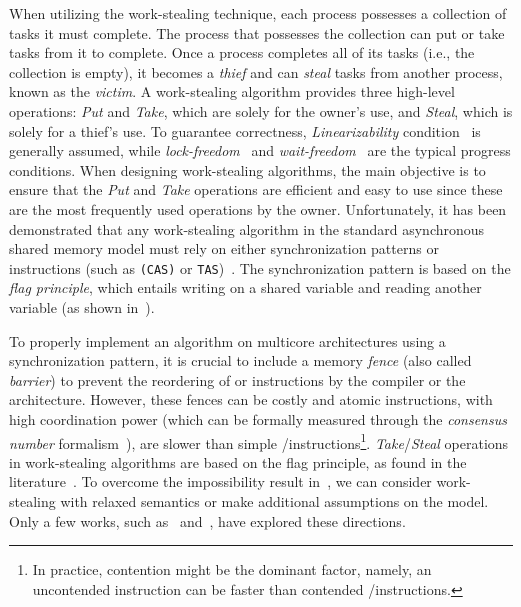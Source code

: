 When utilizing the work-stealing technique, each process possesses a collection of tasks it must complete. The process that possesses the collection can put or take tasks from it to complete. Once a process completes all of its tasks (i.e., the collection is empty), it becomes a \emph{thief} and can \emph{steal} tasks from another process, known as the \emph{victim}. A work-stealing algorithm provides three high-level operations: \emph{Put} and \emph{Take}, which are solely for the owner's use, and \emph{Steal}, which is solely for a thief's use. To guarantee correctness, \emph{Linearizability} condition~\cite{DBLP_journals_toplas_HerlihyW90}  is generally assumed, while \emph{lock-freedom}~\cite{DBLP_journals_toplas_HerlihyW90}  and \emph{wait-freedom}~\cite{DBLP_journals_toplas_Herlihy91} are the typical progress conditions. When designing work-stealing algorithms, the main objective is to ensure that the \emph{Put} and \emph{Take} operations are efficient and easy to use since these are the most frequently used operations by the owner. Unfortunately, it has been demonstrated that any work-stealing algorithm in the standard asynchronous shared memory model must rely on either \RAW synchronization patterns or \emph{\RMW} instructions (such as \CAS \texttt{(CAS)} or \TAS \texttt{TAS})~\cite{DBLP_conf_popl_AttiyaGHKMV11}. The \RAW synchronization pattern is based on the \emph{flag principle}, which entails writing on a shared variable and reading another variable (as shown in~\cite{DBLP_books_daglib_0020056}).

To properly implement an algorithm on multicore architectures using a synchronization pattern, it is crucial to include a memory \emph{fence} (also called \emph{barrier}) to prevent the reordering of \R or \W instructions by the compiler or the architecture. However, these fences can be costly and atomic \RMW instructions, with high coordination power (which can be formally measured through the \emph{consensus number} formalism~\cite{DBLP_journals_toplas_Herlihy91}), are slower than simple \R/\W instructions\footnote{In practice, contention might be the dominant factor, namely, an uncontended \RMW instruction can be faster than contended \R/\W instructions.}. \emph{Take}/\emph{Steal} operations in work-stealing algorithms are based on the flag principle, as found in the literature~\cite{circular.work.stealing, DBLP_conf_pldi_FrigoLR98, non.blocking.work.stealing, 10.1145.571825.571876}. To overcome the impossibility result in~\cite{DBLP_conf_popl_AttiyaGHKMV11}, we can consider work-stealing with relaxed semantics or make additional assumptions on the model. Only a few works, such as~\cite{maged.vechev.2009} and~\cite{fencefreework}, have explored these directions.

